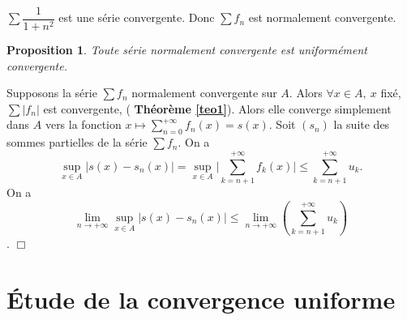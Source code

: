 \documentclass[11pt, a4paper]{book}
\newtheorem{pro}{Proposition}[section]
\newenvironment{pr}{\noindent {\bf Preuve} \noindent} {\hfill $\Box$\vskip 5mm}
\begin{document}
$\sum \dfrac{1}{1+n^2}$ est une  s\'erie convergente. Donc $\sum f_n$ est normalement convergente.
\begin{pro} \label{pro4.2.1} Toute s\'erie normalement convergente est uniform\'ement convergente.
\end{pro}
\begin{pr}\quad

Supposons la s\'erie $\sum f_n$ normalement convergente sur $A$. Alors $\forall x\in A, ~x$ fix\'e, $\sum |f_n|$ est convergente, ( \textbf{Th\'eor\`eme \ref{teo1}}). Alors elle converge simplement dans $A$ vers la fonction $ x\longmapsto{\displaystyle  \sum _{n=0}^{+\infty}f_n(x)=s(x)}.$ Soit $(s_n)$ la suite des sommes partielles de la s\'erie $\sum f_n$. On a $$ \sup_{x\in A}|s(x)-s_n(x)|=\sup_{x\in A} \Big|\sum_{k=n+1}^{+\infty} f_k(x)\Big|\leq \sum_{k=n+1}^{+\infty} u_k.$$
On a $$\lim_{n\rightarrow+\infty} \sup_{x\in A}|s(x)-s_n(x)|\leq \lim_{n\rightarrow+\infty} \left( \sum_{k=n+1}^{+\infty} u_k \right) $$.
\end{pr}

\section{\'Etude de la convergence uniforme}
\end{document}
